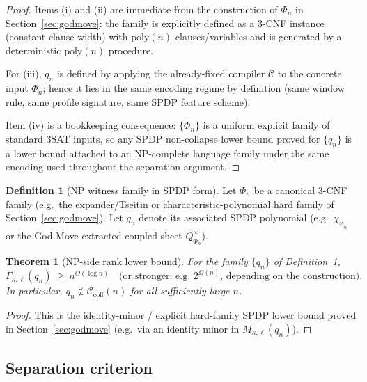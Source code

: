 \documentclass[12pt]{article}
\newcommand{\poly}{\mathrm{poly}}
\newcommand{\Comp}{\mathcal{C}}
\newtheorem{theorem}{Theorem}
\theoremstyle{definition}
\newtheorem{definition}{Definition}
\theoremstyle{definition}
\theoremstyle{remark}
\theoremstyle{remark}
\begin{document}
\begin{proof}
Items (i) and (ii) are immediate from the construction of $\Phi_n$ in
Section~\ref{sec:godmove}: the family is explicitly defined as a 3-CNF
instance (constant clause width) with $\poly(n)$ clauses/variables and is
generated by a deterministic $\poly(n)$ procedure.

For (iii), $q_n$ is defined by applying the already-fixed compiler $\Comp$ to
the concrete input $\Phi_n$; hence it lies in the same encoding regime by
definition (same window rule, same profile signature, same SPDP feature scheme).

Item (iv) is a bookkeeping consequence: $\{\Phi_n\}$ is a uniform explicit
family of standard 3SAT inputs, so any SPDP non-collapse lower bound proved for
$\{q_n\}$ is a lower bound attached to an NP-complete language family under the
same encoding used throughout the separation argument.
\end{proof}

\begin{definition}[NP witness family in SPDP form]
\label{def:np-witness-family}
Let $\Phi_n$ be a canonical $3$-CNF family (e.g.\ the expander/Tseitin or
characteristic-polynomial hard family of Section~\ref{sec:godmove}).
Let $q_n$ denote its associated SPDP polynomial (e.g.\ $\chi_{\varphi_n}$ or the
God-Move extracted coupled sheet $Q^\times_{\Phi_n}$).
\end{definition}

\begin{theorem}[NP-side rank lower bound]
\label{thm:np-side-lower-bound}
For the family $\{q_n\}$ of Definition~\ref{def:np-witness-family},
\[
\Gamma_{\kappa,\ell}(q_n)\ \ge\ n^{\Theta(\log n)}
\quad\text{(or stronger, e.g.\ }2^{\Omega(n)}\text{, depending on the construction).}
\]
In particular, $q_n\notin \mathcal{C}_{\mathrm{coll}}(n)$ for all sufficiently
large $n$.
\end{theorem}

\begin{proof}
This is the identity-minor / explicit hard-family SPDP lower bound proved in
Section~\ref{sec:godmove} (e.g.\ via an identity minor in
$M_{\kappa,\ell}(q_n)$).
\end{proof}

\subsection{Separation criterion}
\label{subsec:separation-criterion}
\end{document}
